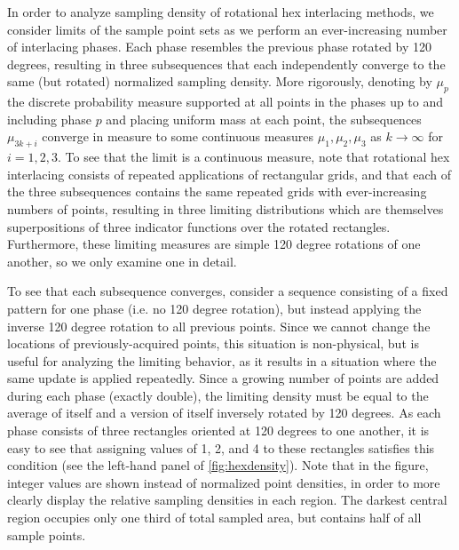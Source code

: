 \documentclass[aip, amsmath, amssymb, nobibnotes, nofootinbib, citeautoscript, reprint, superscriptaddress]{revtex4-1}
\begin{document}
    In order to analyze sampling density of rotational hex interlacing methods, we
    consider limits of the sample point sets as we perform an ever-increasing number
    of interlacing phases.
    Each phase resembles the previous phase rotated by 120 degrees, resulting in
    three subsequences that each independently converge to the same (but rotated)
    normalized sampling density.
    More rigorously, denoting by $\mu_p$ the discrete probability measure supported
    at all points in the phases up to and including phase $p$ and placing uniform
    mass at each point, the subsequences $\mu_{3k+i}$
    converge in measure to some continuous measures $\mu_1,\mu_2,\mu_3$ as
    $k\to\infty$ for $i=1,2,3$.
    To see that the limit is a continuous measure, note that rotational hex
    interlacing consists of repeated applications of rectangular grids, and that
    each of the three subsequences contains the same repeated grids with
    ever-increasing numbers of points, resulting in three limiting distributions
    which are themselves superpositions of three indicator functions over the
    rotated rectangles.
    Furthermore, these limiting measures are simple 120 degree rotations of one
    another, so we only examine one in detail.


    To see that each subsequence converges, consider a sequence consisting of a
    fixed pattern for one phase (i.e. no 120 degree rotation), but instead applying
    the inverse 120 degree rotation to all previous points.
    Since we cannot change the locations of previously-acquired points, this
    situation is non-physical, but is useful for analyzing the limiting behavior,
    as it results in a situation where the same update is applied repeatedly.
    Since a growing number of points are added during each phase (exactly double),
    the limiting density must be equal to the average of itself and a version of
    itself inversely rotated by 120 degrees.
    As each phase consists of three rectangles oriented at 120 degrees to one
    another, it is easy to see that assigning values of 1, 2, and 4 to these
    rectangles satisfies this condition (see the left-hand panel of
    \autoref{fig:hexdensity}).
    Note that in the figure, integer values are shown instead of normalized point
    densities, in order to more clearly display the relative sampling densities in
    each region.
    The darkest central region occupies only one third of total sampled area, but
    contains half of all sample points.
\end{document}

